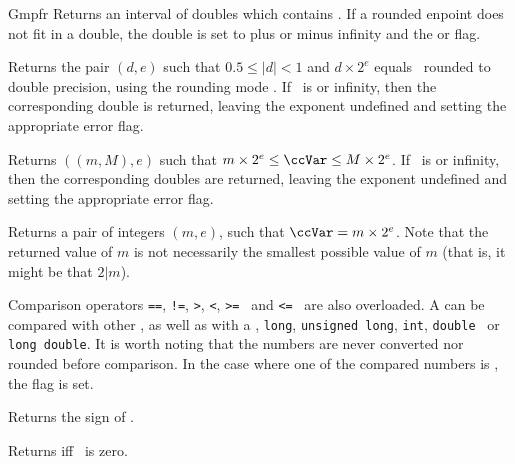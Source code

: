 \begin{ccRefClass} {Gmpfr}
        {Returns an interval of doubles which contains \ccVar. If a
        rounded enpoint does not fit in a double, the double is set to plus
        or minus infinity and the  or  flag.}

        {Returns the pair \( (d,e) \) such that \( 0.5 \le |d| < 1 \) and
        \( d \times 2^e \) equals \ccVar~rounded to double precision,
        using the rounding mode . If \ccVar~is  or
        infinity, then the corresponding double is returned, leaving
        the exponent undefined and setting the appropriate error flag.}

        {Returns \( ((m,M),e) \) such that \( m \times 2^e \le \ccVar
        \le M \times 2^e \). If \ccVar~is  or infinity, then
        the corresponding doubles are returned, leaving the exponent
        undefined and setting the appropriate error flag.}

        {Returns a pair of integers \( (m,e) \), such that
        \( \ccVar = m \times 2^e \). Note that the returned value of \(m\)
        is not necessarily the smallest possible value of \(m\) (that is,
        it might be that \(2|m\)).}



Comparison operators \verb-==-, \verb-!=-, \verb->-, \verb-<-,
\verb->=- \ and \verb-<=- \ are also overloaded. A  can
be compared with other , as well as with a ,
\verb=long=, \verb=unsigned long=, \verb=int=, \verb=double= \ or
\verb=long double=. It is worth noting that the numbers are never
converted nor rounded before comparison. In the case where one of
the compared numbers is , the  flag is set.


\ccQueryFunctions

        {Returns the sign of \ccVar.}

        {Returns  iff \ccVar~is zero.}


\end{ccRefClass}
